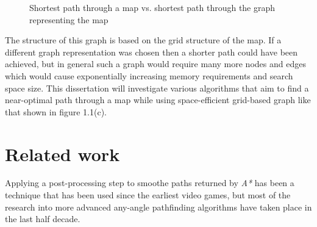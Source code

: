 \documentclass[12pt,notitlepage]{report}
\begin{document}
\begin{figure}[h]
  \caption[Shortest paths through maps and graphs]{Shortest path through a map vs. shortest path through the graph representing the map}
 \label{fig:fart}
\end{figure}

\noindent
The structure of this graph is based on the grid structure of the map. If a different graph representation was chosen then a shorter path could have been achieved, but in general such a graph would require many more nodes and edges which would cause exponentially increasing memory requirements and search space size. This dissertation will investigate various algorithms that aim to find a near-optimal path through a map while using space-efficient grid-based graph like that shown in figure 1.1(c).\\

\section{Related work}

Applying a post-processing step to smoothe paths returned by {\em A*} has been a technique that has been used since the earliest video games\cite{Thorpe84}, but most of the research into more advanced any-angle pathfinding algorithms have taken place in the last half decade. \\
\end{document}
